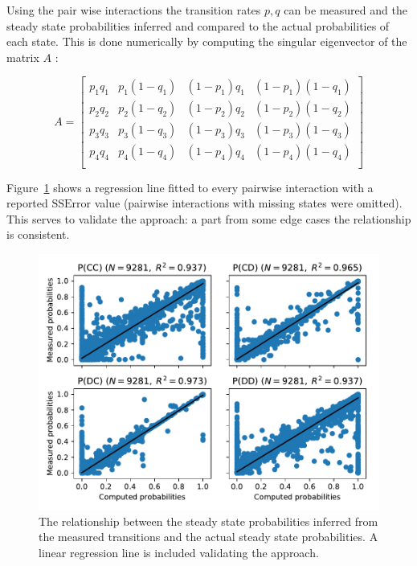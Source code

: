 \documentclass[a4paper]{article}
\begin{document}
Using the pair wise interactions the transition rates \(p,
q\) can be measured and the steady state probabilities inferred and compared to
the actual probabilities of each state.
This is done numerically by computing the singular eigenvector of the
matrix \(A\) \cite{Stewart2009}:

\[
    A =
    \begin{bmatrix}
        p_1 q_1 & p_1 (1 - q_1) & (1 - p_1) q_1 & (1 -p_1) (1 - q_1) \\
        p_2 q_2 & p_2 (1 - q_2) & (1 - p_2) q_2 & (1 -p_2) (1 - q_2) \\
        p_3 q_3 & p_3 (1 - q_3) & (1 - p_3) q_3 & (1 -p_3) (1 - q_3) \\
        p_4 q_4 & p_4 (1 - q_4) & (1 - p_4) q_4 & (1 -p_4) (1 - q_4) \\
    \end{bmatrix}
\]

Figure~\ref{fig:computed_probabilities_vs_theoretic_probabilities} shows a
regression line fitted to every pairwise interaction with a reported
\(\text{SSError}\) value (pairwise interactions with missing states were
omitted). This serves to validate the approach: a part from some edge cases the
relationship is consistent.

\begin{figure}[!htbp]
    \centering
    \includegraphics[width=.8\textwidth]{./assets/img/computed_probabilities_vs_theoretic_probabilities/main.pdf}
    \caption{The
        relationship between the steady state probabilities inferred from the
        measured transitions and the actual steady state probabilities. A linear
        regression line is included validating the approach.}
    \label{fig:computed_probabilities_vs_theoretic_probabilities}
\end{figure}
\end{document}
